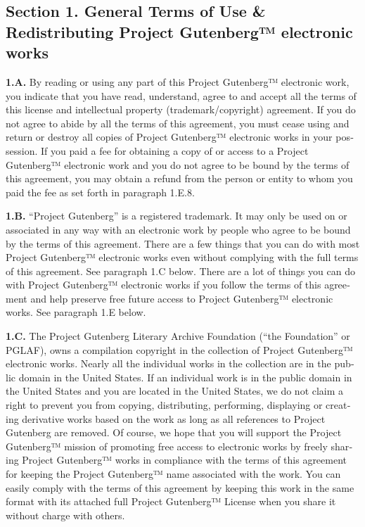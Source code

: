 \documentclass[a5paper]{book}
\begin{document}
\begin{german}
\begin{english}
\begin{pgfooter_env}
\subsection*{Section 1. General Terms of Use \& Redistributing Project Gutenberg™ electronic works}


{\bfseries{1.A.}} By reading or using any part of this Project Gutenberg™
electronic work, you indicate that you have read, understand, agree to
and accept all the terms of this license and intellectual property
(trademark/copyright) agreement. If you do not agree to abide by all
the terms of this agreement, you must cease using and return or
destroy all copies of Project Gutenberg™ electronic works in your
possession. If you paid a fee for obtaining a copy of or access to a
Project Gutenberg™ electronic work and you do not agree to be bound by
the terms of this agreement, you may obtain a refund from the person
or entity to whom you paid the fee as set forth in paragraph 1.E.8.\par

{\bfseries{1.B.}} “Project Gutenberg” is a registered trademark. It may only be
used on or associated in any way with an electronic work by people who
agree to be bound by the terms of this agreement. There are a few
things that you can do with most Project Gutenberg™ electronic works
even without complying with the full terms of this agreement. See
paragraph 1.C below. There are a lot of things you can do with Project
Gutenberg™ electronic works if you follow the terms of this agreement
and help preserve free future access to Project Gutenberg™ electronic
works. See paragraph 1.E below.\par

{\bfseries{1.C.}} The Project Gutenberg Literary Archive Foundation (“the
Foundation” or PGLAF), owns a compilation copyright in the collection
of Project Gutenberg™ electronic works. Nearly all the individual
works in the collection are in the public domain in the United
States. If an individual work is in the public domain in the United
States and you are located in the United States, we do not claim a
right to prevent you from copying, distributing, performing,
displaying or creating derivative works based on the work as long as
all references to Project Gutenberg are removed. Of course, we hope
that you will support the Project Gutenberg™ mission of promoting free
access to electronic works by freely sharing Project Gutenberg™ works
in compliance with the terms of this agreement for keeping the Project
Gutenberg™ name associated with the work. You can easily comply with
the terms of this agreement by keeping this work in the same format
with its attached full Project Gutenberg™ License when you share it
without charge with others.\par


\end{pgfooter_env}
\end{english}
\end{german}
\end{document}
